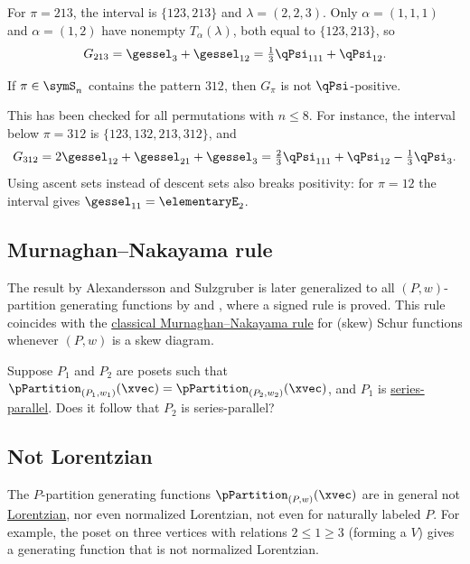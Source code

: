\begin{example}
For $\pi=213$, the interval is $\{123,213\}$ and $\lambda=(2,2,3)$.  Only
$\alpha=(1,1,1)$ and $\alpha=(1,2)$ have nonempty $T_\alpha(\lambda)$, both
equal to $\{123,213\}$, so
\[
  G_{213}=\gessel_{3}+\gessel_{12}=\tfrac{1}{3}\qPsi_{111}+\qPsi_{12}.
\]
\end{example}

\begin{conjecture}[Alexandersson, 2026]\label{conjBruhatIntervalPsiPositive}
If $\pi\in\symS_n$ contains the pattern $312$, then $G_\pi$ is not
$\qPsi$-positive.
\end{conjecture}

This has been checked for all permutations with $n\leq8$.  For instance, the
interval below $\pi=312$ is $\{123,132,213,312\}$, and
\[
  G_{312}=2\gessel_{12}+\gessel_{21}+\gessel_{3}
  =\tfrac{2}{3}\qPsi_{111}+\qPsi_{12}-\tfrac{1}{3}\qPsi_{3}.
\]
Using ascent sets instead of descent sets also breaks positivity: for
$\pi=12$ the interval gives $\gessel_{11}=\elementaryE_2$.


\subsection[pPartitionMNrule]{Murnaghan--Nakayama rule}

The result by Alexandersson and Sulzgruber is 
later generalized to all $(P,w)$-partition generating functions
by  and 
\cite[Thm.~6.9]{LiuWeselcouch2020}, where a signed rule is proved.
This rule coincides with the
\hyperref[skewSchurMurnaghanNakayama]{classical Murnaghan--Nakayama rule}
for (skew) Schur functions whenever $(P,w)$ is a skew diagram.


\begin{question}
Suppose $P_1$ and $P_2$ are posets such that
$\pPartition_{(P_1,w_1)}(\xvec) = \pPartition_{(P_2,w_2)}(\xvec)$,
and $P_1$ is \hyperref[seriesParallelPoset]{series-parallel}.
Does it follow that $P_2$ is series-parallel?
\end{question}


\subsection[pPartitionLorentzian]{Not Lorentzian}

The $P$-partition generating functions $\pPartition_{(P,w)}(\xvec)$ are in
general not \hyperref[lorentzianPolynomial]{Lorentzian}, nor even normalized
Lorentzian, not even for naturally labeled $P$.
For example, the poset on three vertices with relations $2\leq 1 \geq 3$
(forming a $V$) gives a generating function that is not normalized Lorentzian.


